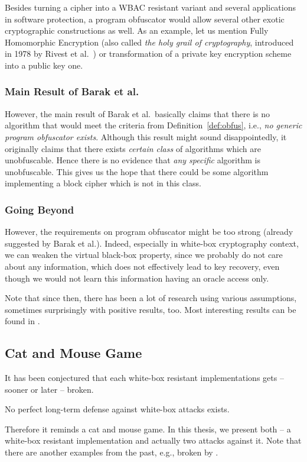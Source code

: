 	Besides turning a cipher into a WBAC resistant variant and several applications in software protection, a program obfuscator would allow several other exotic cryptographic constructions as well. As an example, let us mention Fully Homomorphic Encryption (also called {\em the holy grail of cryptography}, introduced in 1978 by Rivest et al.\ \cite{rivest1978data}) or transformation of a private key encryption scheme into a public key one.

\subsubsection{Main Result of Barak et al.}
	
	However, the main result of Barak et al.\ basically claims that there is no algorithm that would meet the criteria from Definition~\ref{def:obfus}, i.e., {\em no generic program obfuscator exists}. Although this result might sound disappointedly, it originally claims that there exists {\em certain class} of algorithms which are unobfuscable. Hence there is no evidence that {\em any specific} algorithm is unobfuscable. This gives us the hope that there could be some algorithm implementing a block cipher which is not in this class.

\subsubsection{Going Beyond}
	
	However, the requirements on program obfuscator might be too strong (already suggested by Barak et al.). Indeed, especially in white-box cryptography context, we can weaken the virtual black-box property, since we probably do not care about any information, which does not effectively lead to key recovery, even though we would not learn this information having an oracle access only.
	
	Note that since then, there has been a lot of research using various assumptions, sometimes surprisingly with positive results, too. Most interesting results can be found in \cite{barak2014protecting, brakerski2014virtual}.



\subsection{Cat and Mouse Game}   %
\label{sec:catmouse}

It has been conjectured that each white-box resistant implementations gets -- sooner or later -- broken.
\begin{conj}
	No perfect long-term defense against white-box attacks exists.
\end{conj}
Therefore it reminds a cat and mouse game. In this thesis, we present both -- a white-box resistant implementation and actually two attacks against it. Note that there are another examples from the past, e.g., \cite{chow2002des} broken by \cite{jacob2002attacking}.

